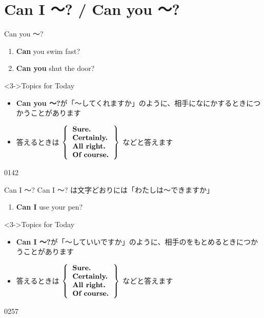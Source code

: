 \documentclass[aspectratio=169,xcolor={dvipsnames,table}]{beamer}
\newcommand{\myaudio}[1]{\href{#1}{\faVolumeUp}}
\begin{document}
\section{Can I ～? / Can you ～?}
\begin{frame}[plain]{Can you ～?}
 
\begin{enumerate}
 \item<1-> \textbf{Can} you swim fast?
 \item<2-> \textbf{Can you} shut the door?  
\end{enumerate}

\begin{block}<3->{Topics for Today}
\begin{itemize}[square]\small
 \item<3->   \textbf{Can you ～?}が「～してくれますか」のように、相手になにかするときにつかうことがあります
 \item<5-> 答えるときは
      $\left\{ \begin{tabular}{l}
		 \textbf{Sure.}\\
		 \textbf{Certainly.}\\
		 \textbf{All right.}\\
		 \textbf{Of course.}
		\end{tabular}\right\}$
などと答えます
 \end{itemize}%
     \end{block}
\hfill{\tiny 0142}\,{\scriptsize \myaudio{./audio/012_can_12.mp3}}

\end{frame}
\begin{frame}[plain]{Can I ～?}
 Can I ～? は文字どおりには「わたしは～できますか」

\begin{enumerate}
 \item<2-> \textbf{Can I} use your pen?  
\end{enumerate}

\begin{block}<3->{Topics for Today}
\begin{itemize}[square]\small
 \item<3->   \textbf{Can I ～?}が「～していいですか」のように、相手のをもとめるときにつかうことがあります
 \item<5-> 答えるときは
      $\left\{ \begin{tabular}{l}
		 \textbf{Sure.}\\
		 \textbf{Certainly.}\\
		 \textbf{All right.}\\
		 \textbf{Of course.}
		\end{tabular}\right\}$
などと答えます
 \end{itemize}%
     \end{block}
\hfill{\tiny 0257}\,{\scriptsize \myaudio{./audio/012_can_13.mp3}}

\end{frame}
\end{document}
